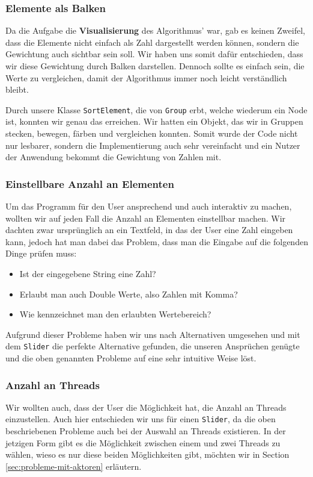 \subsubsection{Elemente als Balken}
Da die Aufgabe die \textbf{Visualisierung} des Algorithmus' war, gab es keinen Zweifel, dass die Elemente nicht einfach als Zahl dargestellt werden können, sondern die Gewichtung auch sichtbar sein soll. Wir haben uns somit dafür entschieden, dass wir diese Gewichtung durch Balken darstellen. Dennoch sollte es einfach sein, die Werte zu vergleichen, damit der Algorithmus immer noch leicht verständlich bleibt.

Durch unsere Klasse \texttt{SortElement}, die von \texttt{Group} erbt, welche wiederum ein Node ist, konnten wir genau das erreichen. Wir hatten ein Objekt, das wir in Gruppen stecken, bewegen, färben und vergleichen konnten. Somit wurde der Code nicht nur lesbarer, sondern die Implementierung auch sehr vereinfacht und ein Nutzer der Anwendung bekommt die Gewichtung von Zahlen mit.

\subsubsection{Einstellbare Anzahl an Elementen}
Um das Programm für den User ansprechend und auch interaktiv zu machen, wollten wir auf jeden Fall die Anzahl an Elementen einstellbar machen. Wir dachten zwar ursprünglich an ein Textfeld, in das der User eine Zahl eingeben kann, jedoch hat man dabei das Problem, dass man die Eingabe auf die folgenden Dinge prüfen muss:

\begin{itemize}
\item Ist der eingegebene String eine Zahl?
\item Erlaubt man auch Double Werte, also Zahlen mit Komma?
\item Wie kennzeichnet man den erlaubten Wertebereich?
\end{itemize}

Aufgrund dieser Probleme haben wir uns nach Alternativen umgesehen und mit dem \texttt{Slider} die perfekte Alternative gefunden, die unseren Ansprüchen genügte und die oben genannten Probleme auf eine sehr intuitive Weise löst.

\subsubsection{Anzahl an Threads}
Wir wollten auch, dass der User die Möglichkeit hat, die Anzahl an Threads einzustellen. Auch hier entschieden wir uns für einen \texttt{Slider}, da die oben beschriebenen Probleme auch bei der Auswahl an Threads existieren. In der jetzigen Form gibt es die Möglichkeit zwischen einem und zwei Threads zu wählen, wieso es nur diese beiden Möglichkeiten gibt, möchten wir in Section \ref{sec:probleme-mit-aktoren} erläutern.

